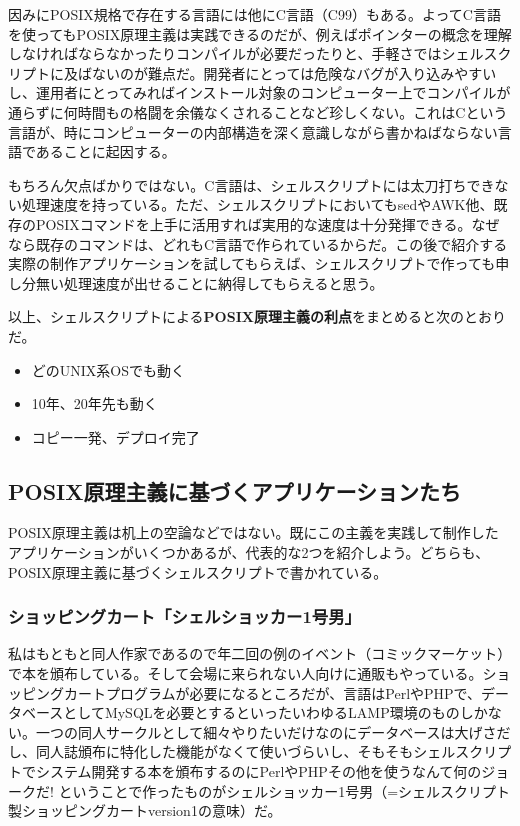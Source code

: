因みにPOSIX規格で存在する言語には他にC言語（C99）もある。よってC言語を使ってもPOSIX原理主義は実践できるのだが、例えばポインターの概念を理解しなければならなかったりコンパイルが必要だったりと、手軽さではシェルスクリプトに及ばないのが難点だ。開発者にとっては危険なバグが入り込みやすいし、運用者にとってみればインストール対象のコンピューター上でコンパイルが通らずに何時間もの格闘を余儀なくされることなど珍しくない。これはCという言語が、時にコンピューターの内部構造を深く意識しながら書かねばならない言語であることに起因する。

もちろん欠点ばかりではない。C言語は、シェルスクリプトには太刀打ちできない処理速度を持っている。ただ、シェルスクリプトにおいてもsedやAWK他、既存のPOSIXコマンドを上手に活用すれば実用的な速度は十分発揮できる。なぜなら既存のコマンドは、どれもC言語で作られているからだ。この後で紹介する実際の制作アプリケーションを試してもらえば、シェルスクリプトで作っても申し分無い処理速度が出せることに納得してもらえると思う。

以上、シェルスクリプトによる\textbf{POSIX原理主義の利点}をまとめると次のとおりだ。
\begin{itemize}
  \item どのUNIX系OSでも動く
  \item 10年、20年先も動く
  \item コピー一発、デプロイ完了
\end{itemize}


\subsection*{POSIX原理主義に基づくアプリケーションたち}

POSIX原理主義は机上の空論などではない。既にこの主義を実践して制作したアプリケーションがいくつかあるが、代表的な2つを紹介しよう。どちらも、POSIX原理主義に基づくシェルスクリプトで書かれている。

\subsubsection*{ショッピングカート「シェルショッカー1号男」}

私はもともと同人作家であるので年二回の例のイベント（コミックマーケット）で本を頒布している。そして会場に来られない人向けに通販もやっている。ショッピングカートプログラムが必要になるところだが、言語はPerlやPHPで、データベースとしてMySQLを必要とするといったいわゆるLAMP環境のものしかない。一つの同人サークルとして細々やりたいだけなのにデータベースは大げさだし、同人誌頒布に特化した機能がなくて使いづらいし、そもそもシェルスクリプトでシステム開発する本を頒布するのにPerlやPHPその他を使うなんて何のジョークだ! ということで作ったものがシェルショッカー1号男（=シェルスクリプト製ショッピングカートversion1の意味）だ。

